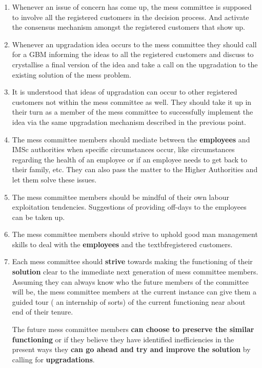 \documentclass[12pt]{report}
\begin{document}
\begin{enumerate}
\item Whenever an issue of concern has come up, the mess committee is supposed to involve all the registered customers in the decision process. And activate the consensus mechanism amongst the registered customers that show up.

\item Whenever an upgradation idea occurs to the mess committee they should call for a GBM informing the ideas to all the registered customers and discuss to crystallise a final version of the idea and take a call on the upgradation to the existing solution of the mess problem.
\item It is understood that ideas of upgradation can occur to other registered customers not within the mess committee as well. They should take it up in their turn as a member of the mess committee to successfully implement the idea via the same upgradation mechanism described in the previous point. 
\item The mess committee members should mediate between the \textbf{employees} and IMSc authorities when specific circumstances occur, like circumstances regarding the health of an employee or if an employee needs to get back to their family, etc. They can also pass the matter to the Higher Authorities and let them solve these issues.
\item The mess committee members should be mindful of their own labour exploitation tendencies. Suggestions of providing off-days to the employees can be taken up.

\item The mess committee members should strive to uphold good man management skills to deal with the \textbf{employees} and the textbf{registered customers}. 

\item Each mess committee should \textbf{strive} towards making the functioning of their \textbf{solution} clear to the immediate next generation of mess committee members. Assuming they can always know who the future members of the committee will be, the mess committee members at the current instance can give them a guided tour ( an internship of sorts) of the current functioning near about end of their tenure. 
\par The future mess committee members \textbf{can choose to preserve the similar functioning} or if they believe they have identified inefficiencies in the present ways they \textbf{can go ahead and try and improve the solution} by calling for \textbf{upgradations}.




\end{enumerate}
\end{document}
